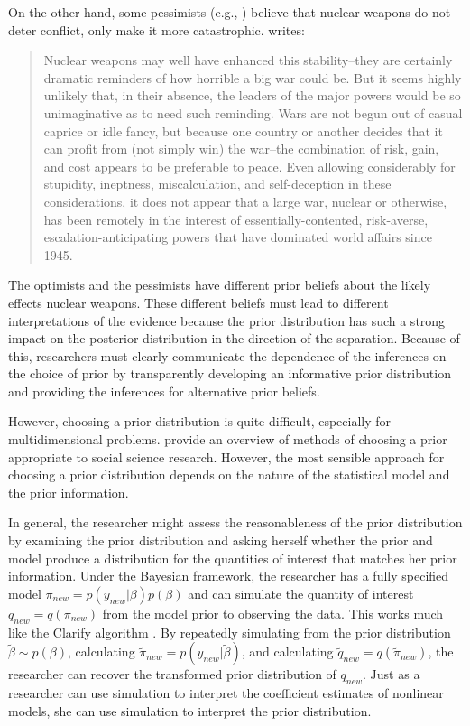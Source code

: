 \documentclass[12pt]{article}
\begin{document}
On the other hand, some pessimists (e.g., \citealt{Sagan1994}) believe that nuclear weapons do not deter conflict, only make it more catastrophic. 
\citet[pp. 68-69]{Mueller1988} writes: 
\begin{quote}
Nuclear weapons may well have enhanced this stability--they are certainly dramatic reminders of how horrible a big war could be. But it seems highly unlikely that, in their absence, the leaders of the major powers would be so unimaginative as to need such reminding. Wars are not begun out of casual caprice or idle fancy, but because one country or another decides that it can profit from (not simply win) the war--the combination of risk, gain, and cost appears to be preferable to peace. Even allowing considerably for stupidity, ineptness, miscalculation, and self-deception in these considerations, it does not appear that a large war, nuclear or otherwise, has been remotely in the interest of essentially-contented, risk-averse, escalation-anticipating powers that have dominated world affairs since 1945.
\end{quote}

The optimists and the pessimists have different prior beliefs about the likely effects nuclear weapons. 
These different beliefs must lead to different interpretations of the evidence because the prior distribution has such a strong impact on the posterior distribution in the direction of the separation. 
Because of this, researchers must clearly communicate the dependence of the inferences on the choice of prior by transparently developing an informative prior distribution and providing the inferences for alternative prior beliefs.

However, choosing a prior distribution is quite difficult, especially for multidimensional problems. 
\cite{GillWalker2005} provide an overview of methods of choosing a prior appropriate to social science research. 
However, the most sensible approach for choosing a prior distribution depends on the nature of the statistical model and the prior information.

In general, the researcher might assess the reasonableness of the prior distribution by examining the prior distribution and asking herself whether the prior and model produce a distribution for the quantities of interest that matches her prior information. 
Under the Bayesian framework, the researcher has a fully specified model $\pi_{new} = p(y_{new}|\beta)p(\beta)$ and can simulate the quantity of interest $q_{new} = q(\pi_{new})$ from the model prior to observing the data. 
This works much like the Clarify algorithm \citep{KingTomzWittenberg2000}.
By repeatedly simulating from the prior distribution $\tilde{\beta} \sim p(\beta)$, calculating $\tilde{\pi}_{new} = p(y_{new}|\tilde{\beta})$, and calculating $\tilde{q}_{new} = q(\tilde{\pi}_{new})$, the researcher can recover the transformed prior distribution of $q_{new}$.
Just as a researcher can use simulation to interpret the coefficient estimates of nonlinear models, she can use simulation to interpret the prior distribution.
\end{document}
